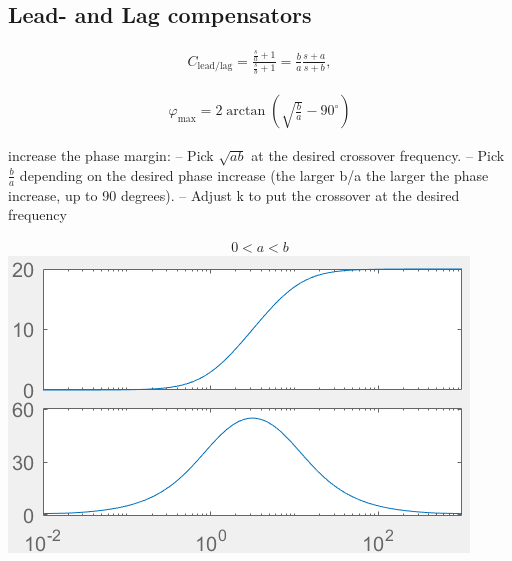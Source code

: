 \subsection{Lead- and Lag compensators}
    \begin{minipage}{0.49\linewidth}
        \begin{align*}
            C_{\text{lead/lag}} = \frac{\frac{s}{a} + 1}{\frac{s}{b} + 1} = \frac{b}{a} \frac{s+a}{s+b}, 
        \end{align*}
    \end{minipage}
    \begin{minipage}{0.49\linewidth}
        \begin{align*}
            \varphi_{\text{max}} = 2 \arctan\left(\sqrt{\frac{b}{a}} - 90^{\circ}\right)
        \end{align*}
    \end{minipage}
    
        \begin{minipage}{0.49\linewidth}
            increase the phase margin:
– Pick $\sqrt{ab}$ at the desired crossover frequency.
– Pick $\frac{b}{a}$ depending on the desired phase increase (the larger b/a the larger the phase
increase, up to 90 degrees).
– Adjust k to put the crossover at the desired frequency
        \end{minipage}
        \begin{minipage}{0.49\linewidth}
            \begin{align*}
                0 < a < b
            \end{align*}
            \includegraphics[width = \linewidth]{src/images/lead-controller.png}
        \end{minipage}

